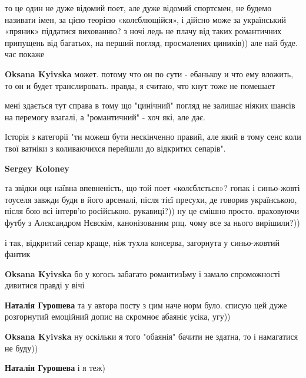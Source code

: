 \begin{itemize}
\begin{itemize}
\end{itemize} %


то це один не дуже відомий поет, але дуже відомий спортсмен, не будемо називати
імен, за цією теорією «колєблющійся», і дійсно може за український «пряник»
піддатися вихованню? з ночі ледь не плачу від таких романтичних припущень від
багатьох, на перший погляд, просмалених циників)) але най буде. час покаже

\begin{itemize} %
\textbf{Oksana Kyivska} может. потому что он по сути - ебанькоу и что ему вложить, то он и будет транслировать. правда, я считаю, что кнут тоже не помешает


мені здається тут справа в тому що "цинічний" погляд не залишає ніяких шансів
на перемогу взагалі, а "романтичний" - хоч які, але дає. 

Історія з категорії "ти можеш бути нескінченно правий, але який в тому сенс
коли твої ватніки з коливаючихся перейшли до відкритих сепарів".


\textbf{Sergey Koloney} 

та звідки оця наївна впевненість, що той поет «колєблється»? гопак і
синьо-жовті тоуселя завжди буди в його арсеналі, після тієї пресухи, де говорив
українською, після бою всі інтерв’ю російською. рукавиці?)) ну це смішно
просто. враховуючи футбу з Алєксандром Нєвскім, канонізованим рпц. чому все за
нього вирішили?))

і так, відкритий сепар краще, ніж тухла консерва, загорнута у синьо-жовтий фантик

\textbf{Oksana Kyivska} бо у когось забагато романтизЬму і замало спроможності дивитися правді у вічі

\textbf{Наталія Гурошева} та у автора посту з цим наче норм було. списую цей дуже розгорнутий емоційний допис на скромноє абаяніє усіка, угу))

\textbf{Oksana Kyivska} ну оскільки я того "обаянія" бачити не здатна, то і намагатися не буду))

\textbf{Наталія Гурошева} і я теж)

\end{itemize} %



\end{itemize}
